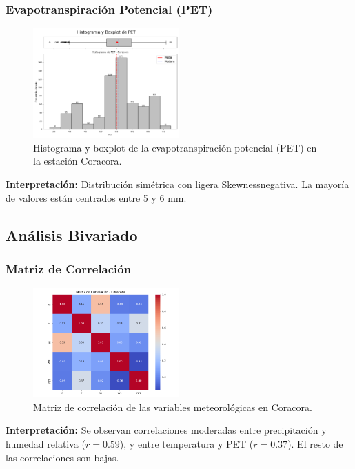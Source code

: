 \subsubsection*{Evapotranspiración Potencial (PET)}
\begin{figure}[H]
\centering
\includegraphics[width=0.5\textwidth]{resultados/por_estacion_meteorologica/Coracora/PET_histograma.png}
\caption{Histograma y boxplot de la evapotranspiración potencial (PET) en la estación Coracora.}
\label{fig:coracora_PET}
\end{figure}
\textbf{Interpretación:} Distribución simétrica con ligera Skewnessnegativa. La mayoría de valores están centrados entre 5 y 6 mm.

\subsection{Análisis Bivariado}

\subsubsection*{Matriz de Correlación}
\begin{figure}[H]
\centering
\includegraphics[width=0.5\textwidth]{resultados/por_estacion_meteorologica/Coracora/matriz_correlacion.png}
\caption{Matriz de correlación de las variables meteorológicas en Coracora.}
\label{fig:coracora_corr}
\end{figure}
\textbf{Interpretación:} Se observan correlaciones moderadas entre precipitación y humedad relativa ($r = 0.59$), y entre temperatura y PET ($r = 0.37$). El resto de las correlaciones son bajas.

